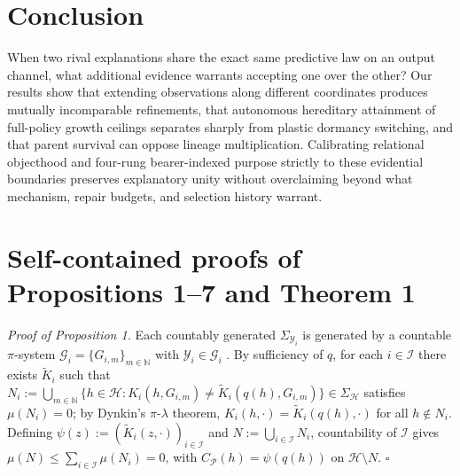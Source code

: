 \documentclass[12pt,letterpaper]{article}
\begin{document}
\section{Conclusion}\label{conclusion}

When two rival explanations share the exact same predictive law on an
output channel, what additional evidence warrants accepting one over the
other? Our results show that extending observations along different
coordinates produces mutually incomparable refinements, that autonomous
hereditary attainment of full-policy growth ceilings separates sharply
from plastic dormancy switching, and that parent survival can oppose
lineage multiplication. Calibrating relational objecthood and four-rung
bearer-indexed purpose strictly to these evidential boundaries preserves
explanatory unity without overclaiming beyond what mechanism, repair
budgets, and selection history warrant.

\appendix

\section{Self-contained proofs of Propositions 1--7 and Theorem
1}\label{self-contained-proofs-of-propositions-17-and-theorem-1}

\emph{Proof of Proposition 1.} Each countably generated
\(\Sigma_{\mathcal{Y}_i}\) is generated by a countable \(\pi\)-system
\(\mathcal{G}_i = \{G_{i,m}\}_{m\in\mathbb{N}}\) with
\(\mathcal{Y}_i \in \mathcal{G}_i\) \citep{kallenberg2021}. By
sufficiency of \(q\), for each \(i \in \mathcal{I}\) there exists
\(\widetilde{K}_i\) such that
\(N_i := \bigcup_{m\in\mathbb{N}} \{h \in \mathcal{H} : K_i(h, G_{i,m}) \neq \widetilde{K}_i(q(h), G_{i,m})\} \in \Sigma_{\mathcal{H}}\)
satisfies \(\mu(N_i) = 0\); by Dynkin's \(\pi\)-\(\lambda\) theorem,
\(K_i(h, \cdot) = \widetilde{K}_i(q(h), \cdot)\) for all
\(h \notin N_i\). Defining
\(\psi(z) := (\widetilde{K}_i(z, \cdot))_{i\in\mathcal{I}}\) and
\(N := \bigcup_{i\in\mathcal{I}} N_i\), countability of \(\mathcal{I}\)
gives \(\mu(N) \le \sum_{i\in\mathcal{I}} \mu(N_i) = 0\), with
\(C_{\mathcal{P}}(h) = \psi(q(h))\) on \(\mathcal{H}\setminus N\).
\(\square\)
\end{document}
